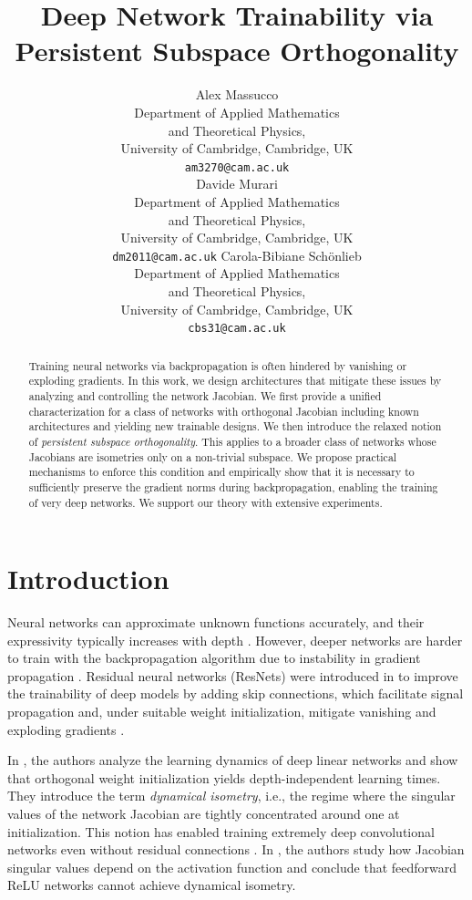 \documentclass{article}
\title{Deep Network Trainability via Persistent Subspace Orthogonality}
\author{ 
Alex Massucco\footnotemark[1]\\
	Department of Applied Mathematics\\
	and Theoretical Physics,\\
	University of Cambridge, Cambridge, UK\\
	\texttt{am3270@cam.ac.uk}\\
\And
Davide Murari\footnotemark[1]\\
	Department of Applied Mathematics\\
	and Theoretical Physics,\\
	University of Cambridge, Cambridge, UK\\
	\texttt{dm2011@cam.ac.uk}
\And
Carola-Bibiane Schönlieb\\
	Department of Applied Mathematics\\
	and Theoretical Physics,\\
	University of Cambridge, Cambridge, UK\\
	\texttt{cbs31@cam.ac.uk}
}
\date{}
\theoremstyle{plain}
\theoremstyle{definition}
\theoremstyle{definition}
\theoremstyle{remark}
\theoremstyle{definition}
\theoremstyle{definition}
\theoremstyle{remark}
\numberwithin{equation}{section}
\begin{document}
\maketitle
{}

\begin{abstract}
Training neural networks via backpropagation is often hindered by vanishing or exploding gradients. In this work, we design architectures that mitigate these issues by analyzing and controlling the network Jacobian. We first provide a unified characterization for a class of networks with orthogonal Jacobian including known architectures and yielding new trainable designs. We then introduce the relaxed notion of \emph{persistent subspace orthogonality}. This applies to a broader class of networks whose Jacobians are isometries only on a non-trivial subspace. We propose practical mechanisms to enforce this condition and empirically show that it is necessary to sufficiently preserve the gradient norms during backpropagation, enabling the training of very deep networks. We support our theory with extensive experiments.
\end{abstract}

\section{Introduction}\label{se:introduction}

Neural networks can approximate unknown functions accurately, and their expressivity typically increases with depth \cite{poggio2017and,yarotsky2017error}. However, deeper networks are harder to train with the backpropagation algorithm due to instability in gradient propagation \cite{hochreiter2001gradient}. Residual neural networks (ResNets) were introduced in \cite{KaimingHe2015} to improve the trainability of deep models by adding skip connections, which facilitate signal propagation and, under suitable weight initialization, mitigate vanishing and exploding gradients \cite{bengio1994,glorot2010}.

In \cite{saxe2014}, the authors analyze the learning dynamics of deep linear networks and show that orthogonal weight initialization yields depth-independent learning times. They introduce the term \emph{dynamical isometry}, i.e., the regime where the singular values of the network Jacobian are tightly concentrated around one at initialization. This notion has enabled training extremely deep convolutional networks even without residual connections \cite{xiao2018}. In \cite{pennington2017}, the authors study how Jacobian singular values depend on the activation function and conclude that feedforward $\mathrm{ReLU}$ networks cannot achieve dynamical isometry.
\end{document}
